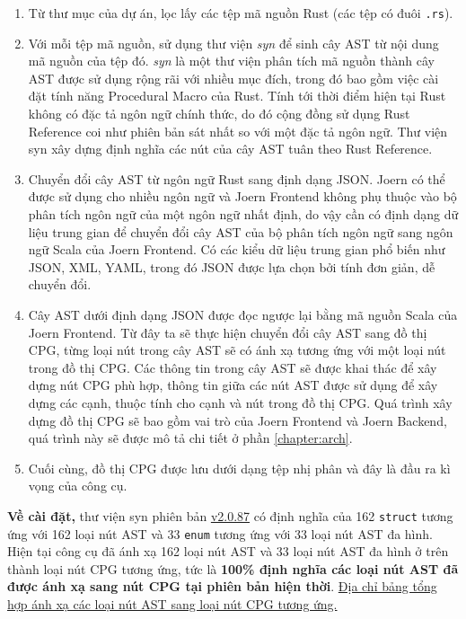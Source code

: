 \begin{enumerate}
	\item Từ thư mục của dự án, lọc lấy các tệp mã nguồn Rust (các tệp có đuôi \texttt{.rs}).
	\item Với mỗi tệp mã nguồn, sử dụng thư viện \textit{syn} \cite{synRust} để sinh cây AST từ nội dung mã nguồn của tệp đó.
	\textit{syn} là một thư viện phân tích mã nguồn thành cây AST được sử dụng rộng rãi với nhiều mục đích, trong đó bao gồm việc cài đặt tính năng Procedural Macro \cite{rustlangProceduralMacros} của Rust.
	Tính tới thời điểm hiện tại Rust không có đặc tả ngôn ngữ chính thức, do đó cộng đồng sử dụng Rust Reference \cite{rustReference} coi như phiên bản sát nhất so với một đặc tả ngôn ngữ.
	Thư viện syn xây dựng định nghĩa các nút của cây AST tuân theo Rust Reference.
	\item Chuyển đổi cây AST từ ngôn ngữ Rust sang định dạng JSON.
	Joern có thể được sử dụng cho nhiều ngôn ngữ và Joern Frontend không phụ thuộc vào bộ phân tích ngôn ngữ của một ngôn ngữ nhất định, do vậy cần có định dạng dữ liệu trung gian để chuyển đổi cây AST của bộ phân tích ngôn ngữ sang ngôn ngữ Scala của Joern Frontend.
	Có các kiểu dữ liệu trung gian phổ biến như JSON, XML, YAML, trong đó JSON được lựa chọn bởi tính đơn giản, dễ chuyển đổi.
	\item Cây AST dưới định dạng JSON được đọc ngược lại bằng mã nguồn Scala của Joern Frontend.
	Từ đây ta sẽ thực hiện chuyển đổi cây AST sang đồ thị CPG, từng loại nút trong cây AST sẽ có ánh xạ tương ứng với một loại nút trong đồ thị CPG.
	Các thông tin trong cây AST sẽ được khai thác để xây dựng nút CPG phù hợp, thông tin giữa các nút AST được sử dụng để xây dựng các cạnh, thuộc tính cho cạnh và nút trong đồ thị CPG.
	Quá trình xây dựng đồ thị CPG sẽ bao gồm vai trò của Joern Frontend và Joern Backend, quá trình này sẽ được mô tả chi tiết ở phần \ref{chapter:arch}.
	\item Cuối cùng, đồ thị CPG được lưu dưới dạng tệp nhị phân và đây là đầu ra kì vọng của công cụ.
\end{enumerate}

\textbf{Về cài đặt,} thư viện syn phiên bản \href{https://docs.rs/syn/2.0.87/syn/}{v2.0.87} có định nghĩa của 162 \texttt{struct} tương ứng với 162 loại nút AST và 33 \texttt{enum} tương ứng với 33 loại nút AST đa hình.
Hiện tại công cụ đã ánh xạ 162 loại nút AST và 33 loại nút AST đa hình ở trên thành loại nút CPG tương ứng, tức là \textbf{100\% định nghĩa các loại nút AST đã được ánh xạ sang nút CPG tại phiên bản hiện thời}.
\href{https://github.com/congnghiahieu/rust-parser/blob/master/docs/MAPPING.md}{Địa chỉ bảng tổng hợp ánh xạ các loại nút AST sang loại nút CPG tương ứng.}

